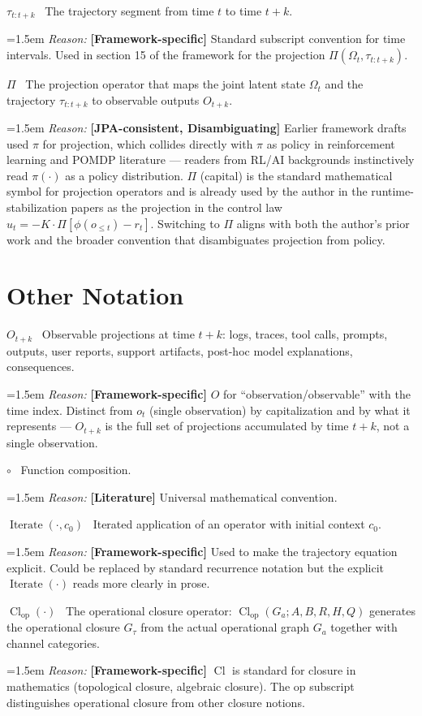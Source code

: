 \documentclass[11pt]{article}
\DeclareMathOperator{\Cl}{Cl}
\DeclareMathOperator{\Iterate}{Iterate}
\newcommand{\notation}[2]{%
  \par\smallskip
  \noindent\textbf{#1} \, #2\par
}
\newcommand{\reason}[2]{%
  \par\nopagebreak
  \begingroup
    \leftskip=1.5em
    \sloppy
    \noindent\textit{Reason:} \textbf{[#1]} #2\par
  \endgroup
  \par\smallskip
}
\begin{document}
\notation{$\tau_{t:t+k}$}{The trajectory segment from time $t$ to time $t+k$.}
\reason{Framework-specific}{Standard subscript convention for time intervals. Used in section 15 of the framework for the projection $\Pi(\Omega_t, \tau_{t:t+k})$.}

\notation{$\Pi$}{The projection operator that maps the joint latent state $\Omega_t$ and the trajectory $\tau_{t:t+k}$ to observable outputs $O_{t+k}$.}
\reason{JPA-consistent, Disambiguating}{Earlier framework drafts used $\pi$ for projection, which collides directly with $\pi$ as policy in reinforcement learning and POMDP literature --- readers from RL/AI backgrounds instinctively read $\pi(\cdot)$ as a policy distribution. $\Pi$ (capital) is the standard mathematical symbol for projection operators and is already used by the author in the runtime-stabilization papers as the projection in the control law $u_t = -K \cdot \Pi[\phi(o_{\le t}) - r_t]$. Switching to $\Pi$ aligns with both the author's prior work and the broader convention that disambiguates projection from policy.}

\section{Other Notation}

\notation{$O_{t+k}$}{Observable projections at time $t+k$: logs, traces, tool calls, prompts, outputs, user reports, support artifacts, post-hoc model explanations, consequences.}
\reason{Framework-specific}{$O$ for ``observation/observable'' with the time index. Distinct from $o_t$ (single observation) by capitalization and by what it represents --- $O_{t+k}$ is the full set of projections accumulated by time $t+k$, not a single observation.}

\notation{$\circ$}{Function composition.}
\reason{Literature}{Universal mathematical convention.}

\notation{$\Iterate(\cdot, c_0)$}{Iterated application of an operator with initial context $c_0$.}
\reason{Framework-specific}{Used to make the trajectory equation explicit. Could be replaced by standard recurrence notation but the explicit $\Iterate(\cdot)$ reads more clearly in prose.}

\notation{$\Cl_{\text{op}}(\cdot)$}{The operational closure operator: $\Cl_{\text{op}}(G_a; A, B, R, H, Q)$ generates the operational closure $G_\tau$ from the actual operational graph $G_a$ together with channel categories.}
\reason{Framework-specific}{$\Cl$ is standard for closure in mathematics (topological closure, algebraic closure). The op subscript distinguishes operational closure from other closure notions.}
\end{document}
